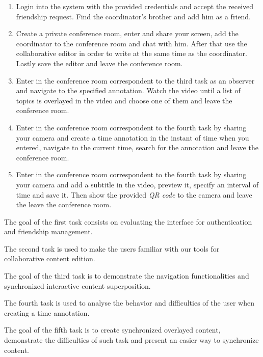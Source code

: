       \begin{enumerate}
      \item Login into the system with the provided credentials and accept the received friendship request. Find the coordinator's brother and add him as a friend.

      \item Create a private conference room, enter and share your screen, add the coordinator to the conference room and chat with him. After that use the collaborative editor in order to write at the same time as the coordinator. Lastly save the editor and leave the conference room.

      \item Enter in the conference room correspondent to the third task as an observer and navigate to the specified annotation. Watch the video until a list of topics is overlayed in the video and choose one of them and leave the conference room.

      \item Enter in the conference room correspondent to the fourth task by sharing your camera and create a time annotation in the instant of time when you entered, navigate to the current time, search for the annotation and leave the conference room.

      \item Enter in the conference room correspondent to the fourth task by sharing your camera and add a subtitle in the video, preview it, specify an interval of time and save it. Then show the provided \emph{QR code} to the camera and leave the leave the conference room.
      \end{enumerate}

      The goal of the first task consists on evaluating the interface for authentication and friendship management.

      The second task is used to make the users familiar with our tools for collaborative content edition.

      The goal of the third task is to demonstrate the navigation functionalities and synchronized interactive content superposition.

      The fourth task is used to analyse the behavior and difficulties of the user when creating a time annotation.

      The goal of the fifth task is to create synchronized overlayed content, demonstrate the difficulties of such task and present an easier way to synchronize content.


